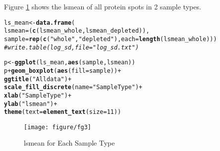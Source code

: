 \documentclass{article}\usepackage[]{graphicx}\usepackage[]{color}
\makeatletter
\def\maxwidth{ %
  \ifdim\Gin@nat@width>\linewidth
    \linewidth
  \else
    \Gin@nat@width
  \fi
}
\newcommand{\hlnum}[1]{\textcolor[rgb]{0.686,0.059,0.569}{#1}}%
\newcommand{\hlstr}[1]{\textcolor[rgb]{0.192,0.494,0.8}{#1}}%
\newcommand{\hlcom}[1]{\textcolor[rgb]{0.678,0.584,0.686}{\textit{#1}}}%
\newcommand{\hlopt}[1]{\textcolor[rgb]{0,0,0}{#1}}%
\newcommand{\hlstd}[1]{\textcolor[rgb]{0.345,0.345,0.345}{#1}}%
\newcommand{\hlkwb}[1]{\textcolor[rgb]{0.69,0.353,0.396}{#1}}%
\newcommand{\hlkwc}[1]{\textcolor[rgb]{0.333,0.667,0.333}{#1}}%
\newcommand{\hlkwd}[1]{\textcolor[rgb]{0.737,0.353,0.396}{\textbf{#1}}}%
\newenvironment{kframe}{%
 \def\at@end@of@kframe{}%
 \ifinner\ifhmode%
  \def\at@end@of@kframe{\end{minipage}}%
  \begin{minipage}{\columnwidth}%
 \fi\fi%
 \def\FrameCommand##1{\hskip\@totalleftmargin \hskip-\fboxsep
 \colorbox{shadecolor}{##1}\hskip-\fboxsep
     \hskip-\linewidth \hskip-\@totalleftmargin \hskip\columnwidth}%
 \MakeFramed {\advance\hsize-\width
   \@totalleftmargin\z@ \linewidth\hsize
   \@setminipage}}%
 {\par\unskip\endMakeFramed%
 \at@end@of@kframe}
\newenvironment{knitrout}{}{} %
\makeatother
\begin{document}
Figure \ref{fig:fg3} shows the  lsmean of all protein spots in 2 sample types.  

\begin{knitrout}
\color{fgcolor}\begin{kframe}
\begin{alltt}
\hlstd{ls_mean} \hlkwb{<-} \hlkwd{data.frame}\hlstd{(}
  \hlkwc{lsmean} \hlstd{= (}\hlkwd{c}\hlstd{(lsmean_whole, lsmean_depleted)),}
  \hlkwc{sample} \hlstd{=} \hlkwd{rep}\hlstd{(}\hlkwd{c}\hlstd{(}\hlstr{"whole"}\hlstd{,} \hlstr{"depleted"}\hlstd{),} \hlkwc{each} \hlstd{=} \hlkwd{length}\hlstd{(lsmean_whole)))}
\hlcom{# write.table(log_sd, file = "log_sd.txt")}

\hlstd{p} \hlkwb{<-} \hlkwd{ggplot}\hlstd{(ls_mean,} \hlkwd{aes}\hlstd{(sample, lsmean))}
\hlstd{p} \hlopt{+} \hlkwd{geom_boxplot}\hlstd{(}\hlkwd{aes}\hlstd{(}\hlkwc{fill} \hlstd{= sample))} \hlopt{+}
  \hlkwd{ggtitle}\hlstd{(}\hlstr{"All data"}\hlstd{)} \hlopt{+}
  \hlkwd{scale_fill_discrete}\hlstd{(}\hlkwc{name}\hlstd{=} \hlstr{"Sample Type"}\hlstd{)} \hlopt{+}
  \hlkwd{xlab}\hlstd{(}\hlstr{"Sample Type"}\hlstd{)} \hlopt{+}
  \hlkwd{ylab}\hlstd{(}\hlstr{"lsmean"}\hlstd{)} \hlopt{+}
  \hlkwd{theme}\hlstd{(}\hlkwc{text} \hlstd{=} \hlkwd{element_text}\hlstd{(}\hlkwc{size}\hlstd{=}\hlnum{11}\hlstd{))}
\end{alltt}
\end{kframe}\begin{figure}[H]

\texttt{[image: figure/fg3]} \caption[lsmean for Each Sample Type]{lsmean for Each Sample Type\label{fig:fg3}}
\end{figure}


\end{knitrout}
\end{document}
